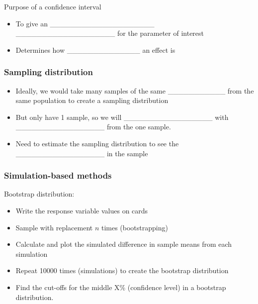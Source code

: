 \documentclass[
]{report}
\begin{document}
\vspace{0.3in}


Purpose of a confidence interval

\begin{itemize}
\item
  To give an \_\_\_\_\_\_\_\_\_\_\_\_\_\_\_\_\_\_\_\_ \_\_\_\_\_\_\_\_\_\_\_\_\_\_\_\_\_\_\_ for the parameter of interest
\item
  Determines how \_\_\_\_\_\_\_\_\_\_\_\_\_\_ an effect is
\end{itemize}


\subsubsection*{Sampling distribution}\label{sampling-distribution}


\begin{itemize}
\item
  Ideally, we would take many samples of the same \_\_\_\_\_\_\_\_\_\_\_ from the same population to create a sampling distribution
\item
  But only have 1 sample, so we will \_\_\_\_\_\_\_\_\_\_\_\_\_\_\_\_\_ with \_\_\_\_\_\_\_\_\_\_\_\_\_\_\_\_\_ from the one sample.
\item
  Need to estimate the sampling distribution to see the \_\_\_\_\_\_\_\_\_\_\_\_\_\_\_\_\_ in the sample
\end{itemize}


\subsubsection*{Simulation-based methods}\label{simulation-based-methods}

Bootstrap distribution:

\begin{itemize}
\item
  Write the response variable values on cards
\item
  Sample with replacement \(n\) times (bootstrapping)
\item
  Calculate and plot the simulated difference in sample means from each simulation
\item
  Repeat 10000 times (simulations) to create the bootstrap distribution
\item
  Find the cut-offs for the middle X\% (confidence level) in a bootstrap distribution.
\end{itemize}
\end{document}
